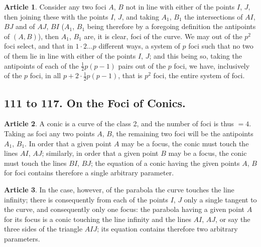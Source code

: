 \documentclass[11pt,a4paper]{article}
\theoremstyle{definition}
\newtheorem{art}{Article}
\begin{document}
\begin{art}
Consider any two foci $A$, $B$ not in line with either of the points $I$, $J$, then joining these with the points $I$, $J$, and taking $A_{1}$, $B_{1}$ the intersections of $AI$, $BJ$ and of $AJ$, $BI$ ($A_{1}$, $B_{1}$ being therefore by a foregoing definition the antipoints of $(A, B)$), then $A_{1}$, $B_{1}$ are, it is clear, foci of the curve. We may out of the $p^{2}$ foci select, and that in $1 \cdot 2 \ldots p$ different ways, a system of $p$ foci such that no two of them lie in line with either of the points $I$, $J$; and this being so, taking the antipoints of each of the $\tfrac{1}{2}p(p - 1)$ pairs out of the $p$ foci, we have, inclusively of the $p$ foci, in all $p + 2 \cdot \tfrac{1}{2}p(p - 1)$, that is $p^{2}$ foci, the entire system of foci.
\end{art}

\subsection{111 to 117. On the Foci of Conics.}

\begin{art}
A conic is a curve of the class 2, and the number of foci is thus $= 4$. Taking as foci any two points $A$, $B$, the remaining two foci will be the antipoints $A_{1}$, $B_{1}$. In order that a given point $A$ may be a focus, the conic must touch the lines $AI$, $AJ$; similarly, in order that a given point $B$ may be a focus, the conic must touch the lines $BI$, $BJ$; the equation of a conic having the given points $A$, $B$ for foci contains therefore a single arbitrary parameter.
\end{art}

\begin{art}
In the case, however, of the parabola the curve touches the line infinity; there is consequently from each of the points $I$, $J$ only a single tangent to the curve, and consequently only one focus: the parabola having a given point $A$ for its focus is a conic touching the line infinity and the lines $AI$, $AJ$, or say the three sides of the triangle $AIJ$; its equation contains therefore two arbitrary parameters.
\end{art}
\end{document}
